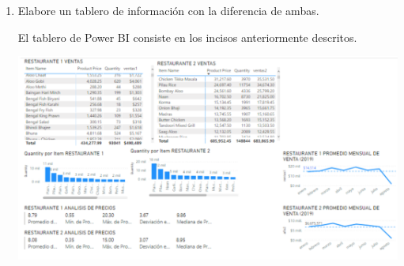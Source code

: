 \begin{enumerate}
	\item Elabore un tablero de información con la diferencia de ambas.
	
		\begin{sol}
		El tablero de Power BI consiste en los incisos anteriormente descritos.
		\begin{center}
			\includegraphics[scale=0.35]{Images/5}
		\end{center}
	\end{sol}
\end{enumerate}


%
%

